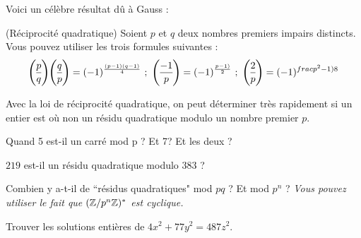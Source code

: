 \bigskip

Voici un c\'el\`ebre r\'esultat d\^u \`a Gauss :

\medskip

\begin{thm} (R\'eciprocit\'e quadratique) Soient $p$ et $q$ deux nombres premiers impairs distincts. Vous pouvez utiliser les trois formules suivantes :
\[{p\overwithdelims () q}{q\overwithdelims () p}=(-1)^{\frac{(p-1)(q-1)}{4}} \ ;\ {-1\overwithdelims () p}= (-1)^{\frac{p-1)}{2}}\ ;\ {2\overwithdelims () p}= (-1)^{frac{p^2-1)}{8}}\] \end{thm}

\medskip

Avec la loi de r\'eciprocit\'e quadratique, on peut d\'eterminer tr\`es rapidement si un entier est o\`u non un r\'esidu quadratique modulo un nombre premier $p$.

\bigskip

\begin{exo} Quand 5 est-il un carr\'e mod p ? Et 7? Et les deux ?\end{exo}

\begin{exo}
$219$ est-il un r\'esidu quadratique modulo $383$ ?
\end{exo}

\begin{exo} Combien y a-t-il de ``r\'esidus quadratiques" mod $pq$ ? Et mod $p^n$ ? \textit{Vous pouvez utiliser le fait que $(\mathbb Z/p^{n}\mathbb Z)^{\ast}$ est cyclique.}\end{exo}

\begin{exo} Trouver les solutions enti\`eres de $4x^2+77y^2=487z^2$. \end{exo}






